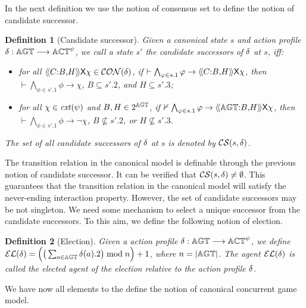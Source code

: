 \documentclass{article}
\newtheorem{definition}{Definition}
\begin{document}
In the next definition 
we use the notion of consensus
set to define the notion
of candidate successor. 

\begin{definition}[Candidate successor]
Given a canonical state $s$ and action profile $\delta : \mathbb{AGT} \longrightarrow \mathbb{ACT}^{\psi }$,
we call a state $s'$ the candidate successors of $\delta$ at $s$, iff:
\begin{itemize}
    \item for all $\langle\!\langle C{:}B{,}H  \rangle\!\rangle\mathsf{X} \chi\in \mathcal{CON}(\delta)$, if $
    \vdash \bigwedge_{\varphi \in s.1} \varphi\rightarrow \langle\!\langle C{:}B{,}H  \rangle\!\rangle\mathsf{X} \chi$, then $  \vdash \bigwedge_{\phi \in s'.1 } \phi \rightarrow \chi$, $B\subseteq s'.2$, and $H\subseteq s'.3$;
    \item for all $\chi\in \mathit{cxt}(\psi)$ and $B,H\in 2^{\mathbb{AGT}}$, if $ \nvdash \bigwedge_{\varphi \in s.1} \varphi \rightarrow \langle\!\langle \mathbb{AGT}{:}B{,}H  \rangle\!\rangle\mathsf{X} \chi$, then $\vdash \bigwedge_{\phi \in s'.1 } \phi \rightarrow \neg \chi$, $B\nsubseteq s'.2$, or $H\nsubseteq s'.3$.
\end{itemize}
The set of all candidate successors of $\delta$ at $s$ is denoted by $\mathcal{CS}(s,\delta)$.
\end{definition} 
The  transition relation in the canonical model is definable through the previous notion
of candidate successor.
It can be verified that
$\mathcal{CS}(s,\delta)\neq \emptyset $.
This guarantees
that the transition relation
in the canonical model will satisfy
the never-ending interaction property. 
However, the set of candidate successors may be not singleton. We need some mechanism to select a unique successor from the candidate successors. To this aim, we define the following notion of election. 

\begin{definition}[Election]
Given a action profile $\delta : \mathbb{AGT} \longrightarrow \mathbb{ACT}^{\psi }$, we define $\mathcal {EL}(\delta) = 
\Big ( \big(\sum_{a\in\mathbb{AGT}}\delta(a).2\big)\bmod n\Big ) +1$, where $n=|\mathbb{AGT}|$. The agent $\mathcal {EL}(\delta)$ is called the elected agent of
the  election relative to the action profile $\delta$.
\end{definition}

We have now all elements
to the define the notion
of canonical concurrent game model.  
\end{document}
